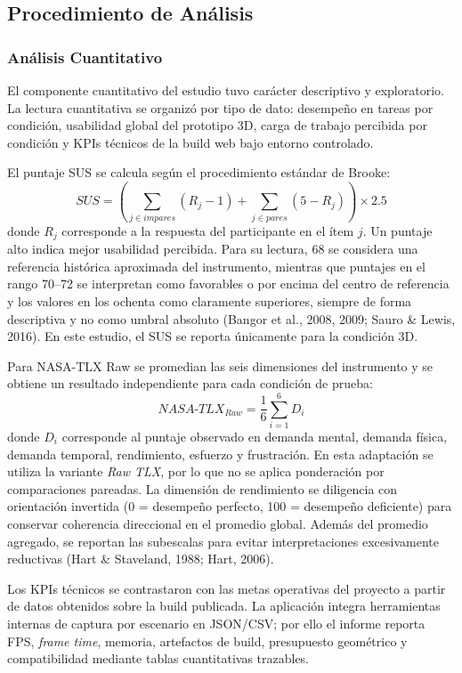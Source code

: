 \subsection{Procedimiento de Análisis}

\subsubsection{Análisis Cuantitativo}

El componente cuantitativo del estudio tuvo carácter descriptivo y exploratorio. La lectura cuantitativa se organizó por tipo de dato: desempeño en tareas por condición, usabilidad global del prototipo 3D, carga de trabajo percibida por condición y KPIs técnicos de la build web bajo entorno controlado.

El puntaje SUS se calcula según el procedimiento estándar de Brooke:
\[
SUS = \left(\sum_{j \in impares}(R_j - 1) + \sum_{j \in pares}(5 - R_j)\right)\times 2.5
\]
donde $R_j$ corresponde a la respuesta del participante en el ítem $j$. Un puntaje alto indica mejor usabilidad percibida. Para su lectura, 68 se considera una referencia histórica aproximada del instrumento, mientras que puntajes en el rango 70--72 se interpretan como favorables o por encima del centro de referencia y los valores en los ochenta como claramente superiores, siempre de forma descriptiva y no como umbral absoluto (Bangor et al., 2008, 2009; Sauro \& Lewis, 2016). En este estudio, el SUS se reporta únicamente para la condición 3D.

Para NASA-TLX Raw se promedian las seis dimensiones del instrumento y se obtiene un resultado independiente para cada condición de prueba:
\[
NASA\text{-}TLX_{Raw} = \frac{1}{6}\sum_{i=1}^{6} D_i
\]
donde $D_i$ corresponde al puntaje observado en demanda mental, demanda física, demanda temporal, rendimiento, esfuerzo y frustración. En esta adaptación se utiliza la variante \textit{Raw TLX}, por lo que no se aplica ponderación por comparaciones pareadas. La dimensión de rendimiento se diligencia con orientación invertida (0 = desempeño perfecto, 100 = desempeño deficiente) para conservar coherencia direccional en el promedio global. Además del promedio agregado, se reportan las subescalas para evitar interpretaciones excesivamente reductivas (Hart \& Staveland, 1988; Hart, 2006).

Los KPIs técnicos se contrastaron con las metas operativas del proyecto a partir de datos obtenidos sobre la build publicada. La aplicación integra herramientas internas de captura por escenario en JSON/CSV; por ello el informe reporta FPS, \textit{frame time}, memoria, artefactos de build, presupuesto geométrico y compatibilidad mediante tablas cuantitativas trazables.


